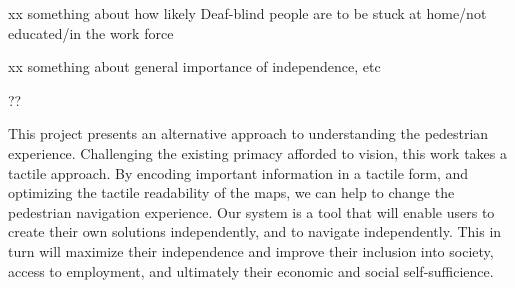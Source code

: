xx something about how likely Deaf-blind people are to be stuck at home/not educated/in the work force

xx something about general importance of independence, etc

??


This project presents an alternative approach to understanding the pedestrian experience. Challenging the existing primacy afforded to vision, this work takes a tactile approach. 
By encoding important information in a tactile form, and optimizing the tactile readability of the maps, we can help to change the pedestrian navigation experience. Our system is a tool that will enable users to create their own solutions independently, and to navigate independently. This in turn will maximize their independence and improve their inclusion into society, access to employment, and ultimately their economic and social self-sufficience. 
